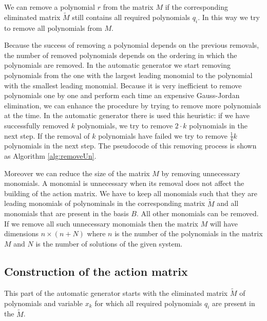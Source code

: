 We can remove a polynomial $r$ from the matrix $M$ if the corresponding eliminated matrix $\tilde{M}$ still contains all required polynomials $q_i$. In this way we try to remove all polynomials from $M$.

Because the success of removing a polynomial depends on the previous removals, the number of removed polynomials depends on the ordering in which the polynomials are removed. In the automatic generator we start removing polynomials from the one with the largest leading monomial to the polynomial with the smallest leading monomial. Because it is very inefficient to remove polynomials one by one and perform each time an expensive Gauss-Jordan elimination, we can enhance the procedure by trying to remove more polynomials at the time. In the automatic generator there is used this heuristic: if we have successfully removed $k$ polynomials, we try to remove $2\cdot k$ polynomials in the next step. If the removal of $k$ polynomials have failed we try to remove $\frac{1}{4}k$ polynomials in the next step. The pseudocode of this removing process is shown as Algorithm \ref{alg:removeUn}.



Moreover we can reduce the size of the matrix $M$ by removing unnecessary monomials. A monomial is unnecessary when its removal does not affect the building of the action matrix. We have to keep all monomials such that they are leading monomials of polynominals in the corresponding matrix $\tilde{M}$ and all monomials that are present in the basis $B$. All other monomials can be removed. If we remove all such unnecessary monomials then the matrix $M$ will have dimensions $n \times (n + N)$ where $n$ is the number of the polynomials in the matrix $M$ and $N$ is the number of solutions of the given system.

\subsection{Construction of the action matrix}
This part of the automatic generator starts with the eliminated matrix $\tilde{M}$ of polynomials and variable $x_k$ for which all required polynomials $q_i$ are present in the $\tilde{M}$.

